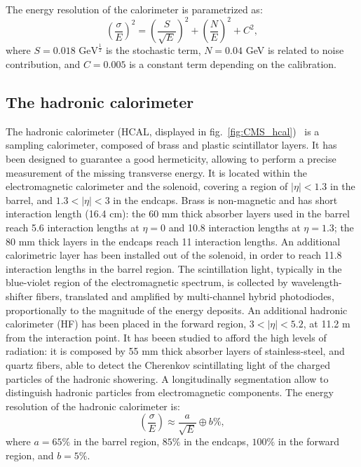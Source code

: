 \noindent The energy resolution of the calorimeter is parametrized as:
\begin{equation}
{\left( \frac{\sigma}{E} \right)}^2 = {\left( \frac{S}{\sqrt{E}} \right)}^2 + {\left( \frac{N}{E} \right)}^2 + C^2,
\end{equation}
where $S=0.018 \text{ GeV}^{\frac{1}{2}}$ is the stochastic term, $N=0.04$ GeV is related to noise contribution, and $C=0.005$ is a constant term depending on the calibration.


\subsection{The hadronic calorimeter}
The hadronic calorimeter (HCAL, displayed in fig.~\ref{fig:CMS_hcal})~\cite{HCAL-TDR} is a sampling calorimeter, composed of brass and plastic scintillator layers. It has been designed to guarantee a good hermeticity, allowing to perform a precise measurement of the missing transverse energy. It is located within the electromagnetic calorimeter and the solenoid, covering a region of $|\eta|<1.3$ in the barrel, and $1.3<|\eta|<3$ in the endcaps. Brass is non-magnetic and has short interaction length (16.4 cm): the 60 mm thick absorber layers used in the barrel reach 5.6 interaction lengths at $\eta=0$ and 10.8 interaction lengths at $\eta = 1.3$; the 80 mm thick layers in the endcaps reach 11 interaction lengths. An additional calorimetric layer has been installed out of the solenoid, in order to reach 11.8 interaction lengths in the barrel region. The scintillation light, typically in the blue-violet region of the electromagnetic spectrum, is collected by wavelength-shifter fibers, translated and amplified by multi-channel hybrid photodiodes, proportionally to the magnitude of the energy deposits. An additional hadronic calorimeter (HF) has been placed in the forward region, $3 < |\eta| < 5.2$, at 11.2 m from the interaction point. It has beeen studied to afford the high levels of radiation: it is composed by 55 mm thick absorber layers of stainless-steel, and quartz fibers, able to detect the Cherenkov scintillating light of the charged particles of the hadronic showering. A longitudinally segmentation allow to distinguish hadronic particles from electromagnetic components.
The energy resolution of the hadronic calorimeter is:
\begin{equation}
\left( \frac{\sigma}{E} \right) \approx \frac{a}{\sqrt{E}} \oplus b\%,
\end{equation}
where $a=65\%$ in the barrel region, $85\%$ in the endcaps, $100\%$ in the forward region, and $b=5\%$.

